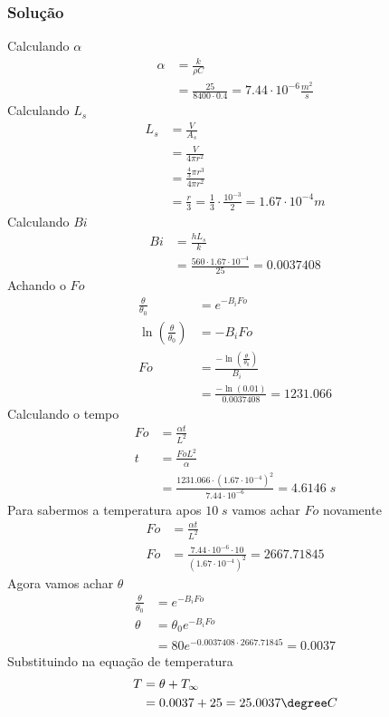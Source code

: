 \subsubsection{Solução}
Calculando \(\alpha \) 
\begin{align}
    \alpha &= \frac{k}{\rho  C}\\
    &= \frac{25}{8400 \cdot 0.4} = 7.44 \cdot 10^{-6} \frac{m^{2} }{s}
\end{align}  
Calculando \(L_{s} \)
\begin{align}
    L_{s} &= \frac{V}{A_{s} } \\
    &= \frac{V}{4 \pi r^{2} } \\
    &= \frac{\frac{4}{3} \pi r^{3} }{4 \pi r^{2} } \\
    &= \frac{r}{3} = \frac{1}{3} \cdot \frac{10^{-3}}{2} = 1.67 \cdot 10^{-4} m 
\end{align}
Calculando \(Bi\)
\begin{align}
    Bi &= \frac{h L_{s} }{k}\\
    &= \frac{560 \cdot 1.67 \cdot 10^{-4} }{25} = 0.0037408
\end{align}
Achando o \(Fo\)
\begin{align}
    \frac{\theta}{\theta_{0}} &= e^{-B_{i} Fo}\\
    \ln{\left( \frac{\theta}{\theta_{0}} \right) } &= -B_{i} Fo\\
    Fo &= \frac{-\ln{\left( \frac{\theta}{\theta_{0}} \right) }}{B_{i}} \\
    &= \frac{-\ln{\left( 0.01 \right) }}{0.0037408} = 1231.066
\end{align}
Calculando o tempo
\begin{align}
    Fo &= \frac{\alpha t}{L^{2} } \\
    t &= \frac{Fo L^{2} }{\alpha} \\
    &= \frac{1231.066 \cdot (1.67 \cdot 10^{-4})^{2}  }{7.44 \cdot 10^{-6} } = 4.6146 \; s
\end{align}
Para sabermos a temperatura apos \(10 \; s\) vamos achar \(Fo\) novamente
\begin{align}
    Fo &= \frac{\alpha t}{L^{2} } \\
    Fo &= \frac{7.44 \cdot 10^{-6} \cdot 10}{(1.67 \cdot 10^{-4})^{2} } = 2667.71845
\end{align}
Agora vamos achar \(\theta \) 
\begin{align}
    \frac{\theta}{\theta_{0}} &= e^{-B_{i} Fo}\\
    \theta &= \theta_{0} e^{-B_{i} Fo}\\
    &= 80 e^{-0.0037408 \cdot 2667.71845} = 0.0037
\end{align}
Substituindo na equação de temperatura
\begin{align}
    T &= \theta + T_{\infty} \\
    &= 0.0037 + 25 = 25.0037 \degree C
\end{align}  
